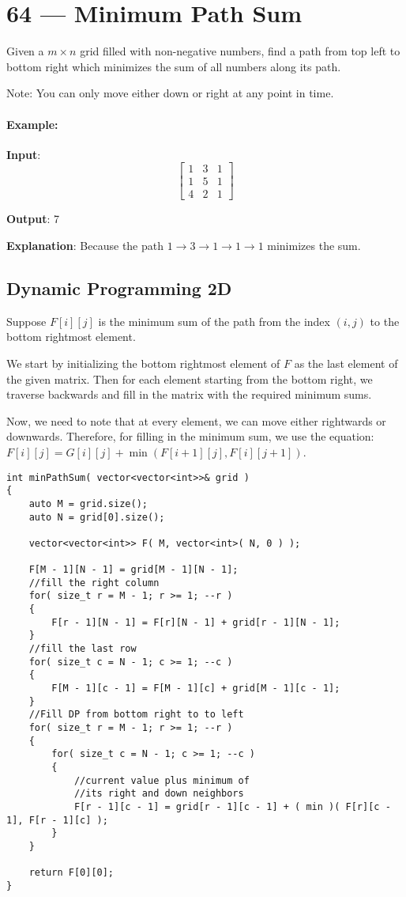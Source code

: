 \section{64 --- Minimum Path Sum}
Given a $m \times n$ grid filled with non-negative numbers, find a path from top left to bottom right which minimizes the sum of all numbers along its path.

Note: You can only move either down or right at any point in time.

\paragraph{Example:}
\begin{flushleft}


\textbf{Input}:
\[
\begin{bmatrix}
1 & 3 & 1\\
1 & 5 & 1\\
4 & 2 & 1
\end{bmatrix}
\]

\textbf{Output}: 7

\textbf{Explanation}: Because the path $1\to 3 \to 1 \to 1 \to 1$ minimizes the sum.


\end{flushleft}

\subsection{Dynamic Programming 2D}
Suppose $F[i][j]$ is the minimum sum of the path from the index $(i,j)$ to the bottom rightmost element. 

We start by initializing the bottom rightmost element of $F$ as the last element of the given matrix. Then for each element starting from the bottom right, we traverse backwards and fill in the matrix with the required minimum sums. 

Now, we need to note that at every element, we can move either rightwards or downwards. Therefore, for filling in the minimum sum, we use the equation: $F[i][j] = G[i][j] + \min(F[i+1][j], F[i][j+1])$.

\setcounter{lstlisting}{0}
\begin{lstlisting}[style=customc, caption={2D DP}]
int minPathSum( vector<vector<int>>& grid )
{
    auto M = grid.size();
    auto N = grid[0].size();

    vector<vector<int>> F( M, vector<int>( N, 0 ) );

    F[M - 1][N - 1] = grid[M - 1][N - 1];
    //fill the right column
    for( size_t r = M - 1; r >= 1; --r )
    {
        F[r - 1][N - 1] = F[r][N - 1] + grid[r - 1][N - 1];
    }
    //fill the last row
    for( size_t c = N - 1; c >= 1; --c )
    {
        F[M - 1][c - 1] = F[M - 1][c] + grid[M - 1][c - 1];
    }
    //Fill DP from bottom right to to left
    for( size_t r = M - 1; r >= 1; --r )
    {
        for( size_t c = N - 1; c >= 1; --c )
        {
            //current value plus minimum of
            //its right and down neighbors
            F[r - 1][c - 1] = grid[r - 1][c - 1] + ( min )( F[r][c - 1], F[r - 1][c] );
        }
    }

    return F[0][0];
}
\end{lstlisting}